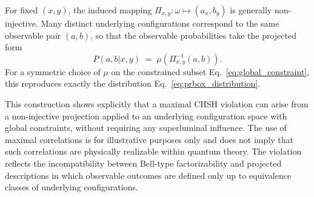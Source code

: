  For fixed $(x,y)$, the induced mapping
  $\Pi_{x,y}:\omega \mapsto (a_x,b_y)$ is generally non-injective.
  Many distinct underlying configurations correspond to the same observable pair
  $(a,b)$, so that the observable probabilities take the projected form
  \begin{equation}
    P(a,b|x,y) \;=\; \mu\!\left(\Pi_{x,y}^{-1}(a,b)\right).
    \label{eq:projected_probabilities_chsh}
  \end{equation}
  For a symmetric choice of $\mu$ on the constrained subset
  Eq.~\eqref{eq:global_constraint}, this reproduces exactly the distribution
  Eq.~\eqref{eq:prbox_distribution}.

  \medskip
  \noindent
  This construction shows explicitly that a maximal CHSH violation can arise from a
  non-injective projection applied to an underlying configuration space with global
  constraints, without requiring any superluminal influence.
  The use of maximal correlations is for illustrative purposes only and does not
  imply that such correlations are physically realizable within quantum theory.
  The violation reflects the incompatibility between Bell-type factorizability and
  projected descriptions in which observable outcomes are defined only up to
  equivalence classes of underlying configurations.
